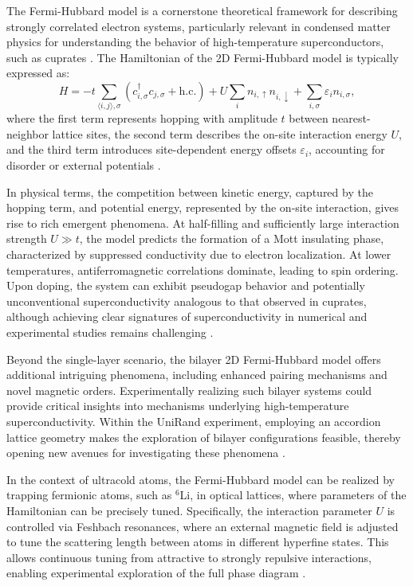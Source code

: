
The Fermi-Hubbard model is a cornerstone theoretical framework for describing strongly correlated electron systems, particularly relevant in condensed matter physics for understanding the behavior of high-temperature superconductors, such as cuprates \cite{koepsell_quantum_2021}. The Hamiltonian of the 2D Fermi-Hubbard model is typically expressed as:
\begin{equation}
H = -t \sum_{\langle i,j \rangle, \sigma} \left( c_{i,\sigma}^\dagger c_{j,\sigma} + \text{h.c.} \right) + U \sum_i n_{i,\uparrow} n_{i,\downarrow} + \sum_{i,\sigma} \varepsilon_i n_{i,\sigma},
\label{eq:fermi-hubbard}
\end{equation}
where the first term represents hopping with amplitude $t$ between nearest-neighbor lattice sites, the second term describes the on-site interaction energy $U$, and the third term introduces site-dependent energy offsets $\varepsilon_i$, accounting for disorder or external potentials \cite{koepsell_quantum_2021}.

In physical terms, the competition between kinetic energy, captured by the hopping term, and potential energy, represented by the on-site interaction, gives rise to rich emergent phenomena. At half-filling and sufficiently large interaction strength $U \gg t$, the model predicts the formation of a Mott insulating phase, characterized by suppressed conductivity due to electron localization. At lower temperatures, antiferromagnetic correlations dominate, leading to spin ordering. Upon doping, the system can exhibit pseudogap behavior and potentially unconventional superconductivity analogous to that observed in cuprates, although achieving clear signatures of superconductivity in numerical and experimental studies remains challenging \cite{koepsell_quantum_2021}.

Beyond the single-layer scenario, the bilayer 2D Fermi-Hubbard model offers additional intriguing phenomena, including enhanced pairing mechanisms and novel magnetic orders. Experimentally realizing such bilayer systems could provide critical insights into mechanisms underlying high-temperature superconductivity. Within the UniRand experiment, employing an accordion lattice geometry makes the exploration of bilayer configurations feasible, thereby opening new avenues for investigating these phenomena \cite{huang_construction_2024}.

In the context of ultracold atoms, the Fermi-Hubbard model can be realized by trapping fermionic atoms, such as $^6$Li, in optical lattices, where parameters of the Hamiltonian can be precisely tuned. Specifically, the interaction parameter $U$ is controlled via Feshbach resonances, where an external magnetic field is adjusted to tune the scattering length between atoms in different hyperfine states. This allows continuous tuning from attractive to strongly repulsive interactions, enabling experimental exploration of the full phase diagram \cite{culemann_construction_2024}.

